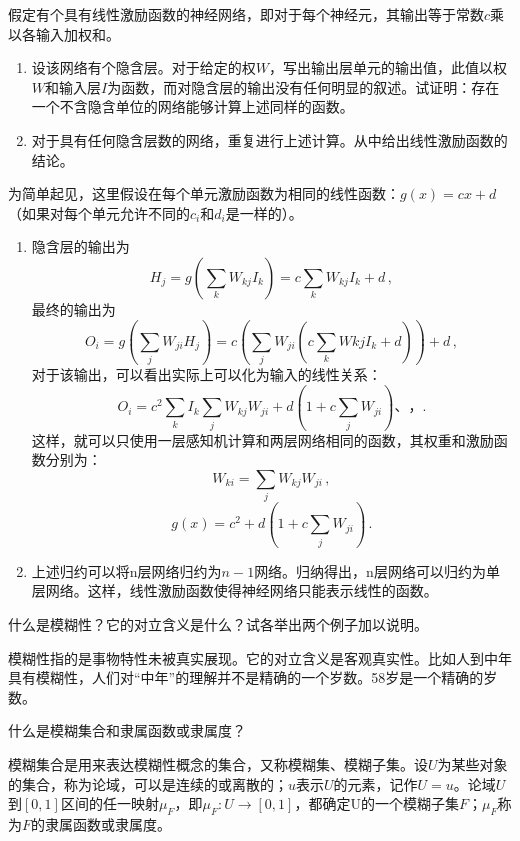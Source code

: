 \begin{question}
假定有个具有线性激励函数的神经网络，即对于每个神经元，其输出等于常数$c$乘以各输入加权和。
	\begin{enumerate}
		\item 设该网络有个隐含层。对于给定的权$W$，写出输出层单元的输出值，此值以权$W$和输入层$I$为函数，而对隐含层的输出没有任何明显的叙述。试证明：存在一个不含隐含单位的网络能够计算上述同样的函数。
		\item 对于具有任何隐含层数的网络，重复进行上述计算。从中给出线性激励函数的结论。
	\end{enumerate}
\end{question}
\begin{solution}
为简单起见，这里假设在每个单元激励函数为相同的线性函数：$g(x)=cx+d$（如果对每个单元允许不同的$c_i$和$d_i$是一样的）。
	\begin{enumerate}
	\item 隐含层的输出为
	\[ H_j = g \left( \sum\limits_k W_{kj} I_k \right) = c \sum\limits_k W_{kj} I_k + d \, ,\]
	最终的输出为
	\[ O_i = g \left( \sum\limits_j W_{ji} H_j \right) = c \left( \sum\limits_j W_{ji} \left( c \sum\limits_k W{kj} I_k + d \right) \right) + d \, ,\]
	对于该输出，可以看出实际上可以化为输入的线性关系：
	\[ O_i = c^2 \sum\limits_k I_k \sum\limits_j W_{kj} W_{ji} + d \left( 1 + c \sum\limits_j W_{ji} \right) 、， . \]
	这样，就可以只使用一层感知机计算和两层网络相同的函数，其权重和激励函数分别为：
	\[ W_{ki} = \sum\limits_j W_{kj} W_{ji} \, ,\]
	\[ g(x) = c^2 + d \left( 1+c \sum\limits_j W_{ji} \right) \, .\]
	\item 上述归约可以将n层网络归约为$n-1$网络。归纳得出，n层网络可以归约为单层网络。这样，线性激励函数使得神经网络只能表示线性的函数。
	\end{enumerate}
\end{solution}

\begin{question}
什么是模糊性？它的对立含义是什么？试各举出两个例子加以说明。
\end{question}
\begin{solution}
模糊性指的是事物特性未被真实展现。它的对立含义是客观真实性。比如人到中年具有模糊性，人们对``中年''的理解并不是精确的一个岁数。58岁是一个精确的岁数。
\end{solution}

\begin{question}
什么是模糊集合和隶属函数或隶属度？
\end{question}
\begin{solution}
模糊集合是用来表达模糊性概念的集合，又称模糊集、模糊子集。设$U$为某些对象的集合，称为论域，可以是连续的或离散的；$u$表示$U$的元素，记作$U={u}$。论域$U$到$[0,1]$区间的任一映射$\mu_F$，即$\mu_F \colon U\to [0,1]$，都确定U的一个模糊子集$F$；$\mu_F$称为$F$的隶属函数或隶属度。
\end{solution}

